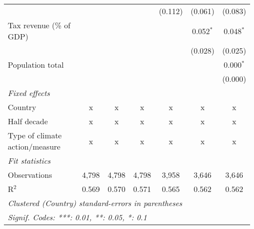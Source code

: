 \begin{tabular}{lcccccc}
                                                    &         &         &                & (0.112)        & (0.061)        & (0.083)\\   
   Tax revenue (\% of GDP)                          &         &         &                &                & 0.052$^{*}$    & 0.048$^{*}$\\   
                                                    &         &         &                &                & (0.028)        & (0.025)\\   
   Population total                                 &         &         &                &                &                & 0.000$^{*}$\\   
                                                    &         &         &                &                &                & (0.000)\\   
   \emph{Fixed effects}\\
   Country                                          & x       & x       & x              & x              & x              & x\\  
   Half decade                                      & x       & x       & x              & x              & x              & x\\  
   Type of climate action/measure                   & x       & x       & x              & x              & x              & x\\  
   \midrule \emph{Fit statistics}\\
   Observations                                     & 4,798   & 4,798   & 4,798          & 3,958          & 3,646          & 3,646\\  
   R$^2$                                            & 0.569   & 0.570   & 0.571          & 0.565          & 0.562          & 0.562\\  
   \midrule
   \multicolumn{7}{l}{\emph{Clustered (Country) standard-errors in parentheses}}\\
   \multicolumn{7}{l}{\emph{Signif. Codes: ***: 0.01, **: 0.05, *: 0.1}}\\
\end{tabular}
\par\endgroup


